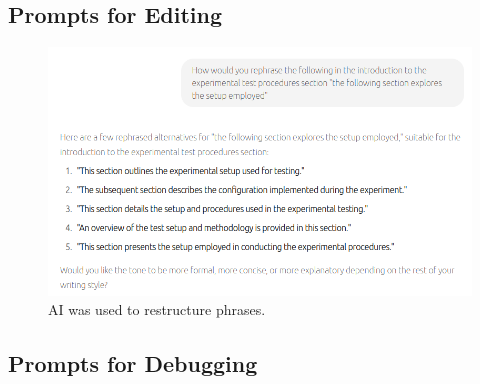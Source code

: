 \documentclass[class=report,11pt,crop=false]{standalone}
\begin{document}
	\subsection{Prompts for Editing}
	
	\begin{figure}[ht!]
		\centering
		\includegraphics[width=0.50\linewidth]{Figures/Appendices/editing}
		\caption{AI was used to restructure phrases.}
		\label{fig:prompts-editing}
	\end{figure} 
	
	\subsection{Prompts for Debugging}
	
	\ifstandalone
	
	\printnoidxglossary[type=\acronymtype,nonumberlist]
	\fi
\end{document}
